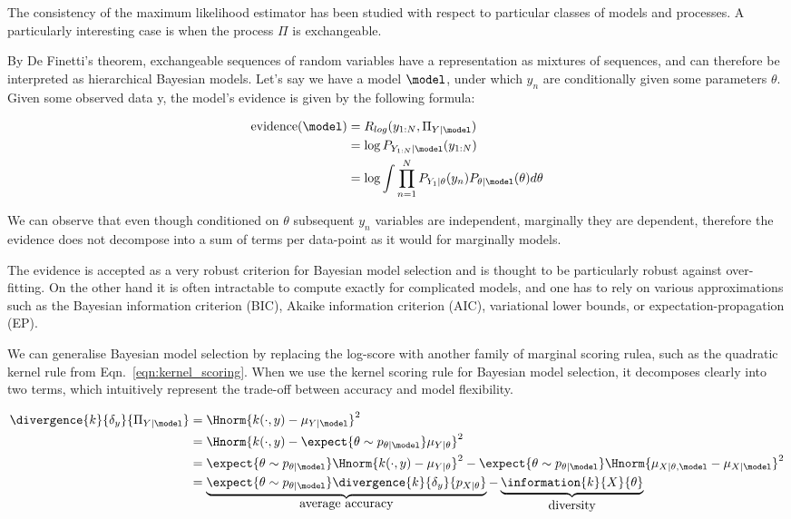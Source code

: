 The consistency of the maximum likelihood estimator has been studied with respect to particular classes of models and processes. A particularly interesting case is when the process $\Pi$ is exchangeable.

By De Finetti's theorem, exchangeable sequences of random variables have a representation as mixtures of \iid sequences, and can therefore be interpreted as hierarchical Bayesian models. Let's say we have a model $\model$, under which $y_n$ are conditionally \iid given some parameters $\theta$. Given some observed data y, the model's evidence is given by the following formula:

\begin{align}
	\mbox{evidence}(\model) &= R_{log}(y_{1:N},\Pi_{Y\vert\model})\\
		&= \log P_{Y_{1:N}\vert\model}(y_{1:N})\\
		&= \log \int \prod_{n=1}^{N} P_{Y_1\vert\theta}(y_n) P_{\theta\vert\model}(\theta) d\theta
\end{align}

We can observe that even though conditioned on $\theta$ subsequent $y_n$ variables are independent, marginally they are dependent, therefore the evidence does not decompose into a sum of terms per data-point as it would for marginally \iid models.

The evidence is accepted as a very robust criterion for Bayesian model selection and is thought to be particularly robust against over-fitting. On the other hand it is often intractable to compute exactly for complicated models, and one has to rely on various approximations such as the Bayesian information criterion (BIC)\citep{}, Akaike information criterion (AIC)\citep{}, variational lower bounds, or expectation-propagation (EP)\citep{}.

We can generalise Bayesian model selection by replacing the log-score with another family of marginal scoring rulea, such as the quadratic kernel rule from Eqn.\ \eqref{eqn:kernel_scoring}. When we use the kernel scoring rule for Bayesian model selection, it decomposes clearly into two terms, which intuitively represent the trade-off between accuracy and model flexibility.

\begin{align}
	\divergence{k}{\delta_{y}}{\Pi_{Y\vert\model}} &= \Hnorm{k(\cdot,y) - \mu_{Y\vert\model}}^2\\
		&= \Hnorm{k(\cdot,y) - \expect{\theta\sim p_{\theta\vert\model}}\mu_{Y\vert\theta}}^2\\
		&= \expect{\theta\sim p_{\theta\vert\model}} \Hnorm{k(\cdot,y) - \mu_{Y\vert\theta}}^2 - \expect{\theta\sim p_{\theta\vert\model}}\Hnorm{\mu_{X\vert \theta,\model} - \mu_{X\vert\model}}^2\\
		&= \underbrace{\expect{\theta\sim p_{\theta\vert\model}} \divergence{k}{\delta_{y}}{p_{X\vert\theta}} }_{\mbox{average accuracy}} -  \underbrace{\information{k}{X}{\theta}}_{\mbox{diversity}}
\end{align}

